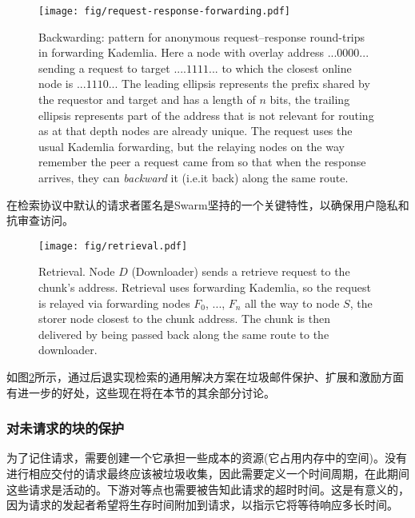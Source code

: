 \begin{figure}[htbp]
   \centering
   \texttt{[image: fig/request-response-forwarding.pdf]}
   \caption[Backwarding: a pattern for anonymous request-response round-trips in forwarding Kademlia \statusgreen]{Backwarding: pattern for anonymous request--response round-trips in forwarding Kademlia. Here a node with overlay address $...0000...$ sending a request to target $....1111...$ to which the closest online node is $...1110...$ The leading ellipsis represents the prefix shared by the requestor and target and has a length of $n$ bits, the trailing ellipsis represents part of the address that is not relevant for routing as at that depth nodes are already unique. The request uses the usual Kademlia forwarding, but the relaying nodes on the way remember the peer a request came from so that when the response arrives, they can \emph{backward} it (i.e.\pass it back) along the same route.}
   \label{fig:request-response}
\end{figure}

在检索协议中默认的请求者匿名是Swarm坚持的一个关键特性，以确保用户隐私和抗审查访问。

\begin{figure}[htbp]
   \centering
   \texttt{[image: fig/retrieval.pdf]}
   \caption[Retrieval \statusgreen]{Retrieval. Node $D$ (Downloader) sends a retrieve request to the chunk's address. Retrieval uses forwarding Kademlia, so the request is relayed via forwarding nodes $F_0$, ..., $F_n$ all the way to node $S$, the storer node closest to the chunk address. The chunk is then delivered by being passed back along the same route to the downloader.}
   \label{fig:retrieval}
\end{figure}

如图\ref{fig:retrieval}所示，通过后退实现检索的通用解决方案在垃圾邮件保护、扩展和激励方面有进一步的好处，这些现在将在本节的其余部分讨论。

\subsubsection{对未请求的块的保护}

为了记住请求，需要创建一个它承担一些成本的资源(它占用内存中的空间)。没有进行相应交付的请求最终应该被垃圾收集，因此需要定义一个时间周期，在此期间这些请求是活动的。下游对等点也需要被告知此请求的超时时间。这是有意义的，因为请求的发起者希望将生存时间附加到请求，以指示它将等待响应多长时间。  

